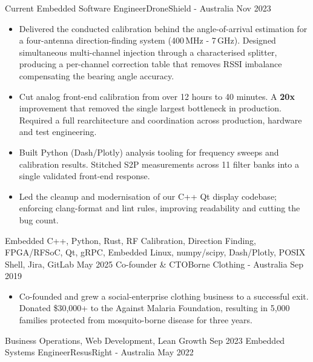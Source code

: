 %
%
%
\begin{experiences}
	\experience
	{Current}	{Embedded Software Engineer}{DroneShield - Australia}
	{Nov 2023}	{
		\begin{itemize}
			\item Delivered the conducted calibration behind the angle-of-arrival estimation for a four-antenna direction-finding system (400\,MHz - 7\,GHz). Designed simultaneous multi-channel injection through a characterised splitter, producing a per-channel correction table that removes RSSI imbalance compensating the bearing angle accuracy.
			\item Cut analog front-end calibration from over 12 hours to 40 minutes. A \textbf{20x} improvement that removed the single largest bottleneck in production. Required a full rearchitecture and coordination across production, hardware and test engineering.
			\item Built Python (Dash/Plotly) analysis tooling for frequency sweeps and calibration results. Stitched S2P measurements across 11 filter banks into a single validated front-end response.
			\item Led the cleanup and modernisation of our C++ Qt display codebase; enforcing clang-format and lint rules, improving readability and cutting the bug count.
		\end{itemize}
	}
	{Embedded C++, Python, Rust, RF Calibration, Direction Finding, FPGA/RFSoC, Qt, gRPC, Embedded Linux, numpy/scipy, Dash/Plotly, POSIX Shell, Jira, GitLab}
	\emptySeparator
	\experience
		{May 2025}	{Co-founder \& CTO}{Borne Clothing - Australia}
		{Sep 2019}	{
			\begin{itemize}
				\item Co-founded and grew a social-enterprise clothing business to a successful exit. Donated \$30,000+ to the Against Malaria Foundation, resulting in 5,000 families protected from mosquito-borne disease for three years.
			\end{itemize}
		}
		{Business Operations, Web Development, Lean Growth}
	\emptySeparator
	\experience
	{Sep 2023}	{Embedded Systems Engineer}{ResusRight - Australia}
	{May 2022}	{
		\begin{itemize}

\end{itemize}}
\end{experiences}
